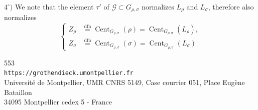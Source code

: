 $4^\circ)$ We  note that the element $\tau'$ of
 $\mathcal G\subset G_{\rho,\sigma}$
normalizes $L_\rho$ and $L_\sigma$, therefore also normalizes
\[
\tag{33}
\left\{\begin{aligned}
Z_\rho&\overset{\mathrm{dfn}}=\operatorname{Cent}_{G_{\rho,\sigma}}(\rho)
=\operatorname{Cent}_{G_{\rho,\sigma}}(L_\rho),\\
Z_\sigma&\overset{\mathrm{dfn}}=\operatorname{Cent}_{G_{\rho,\sigma}}(\sigma)
=\operatorname{Cent}_{G_{\rho,\sigma}}(L_\sigma)
\end{aligned}\right.
\]

{\small
\begin{center}
553\\
\texttt{https://grothendieck.umontpellier.fr}\\
Université de Montpellier, UMR CNRS 5149, Case courrier 051, Place Eugène Bataillon\\
34095 Montpellier cedex 5 - France
\end{center}
}